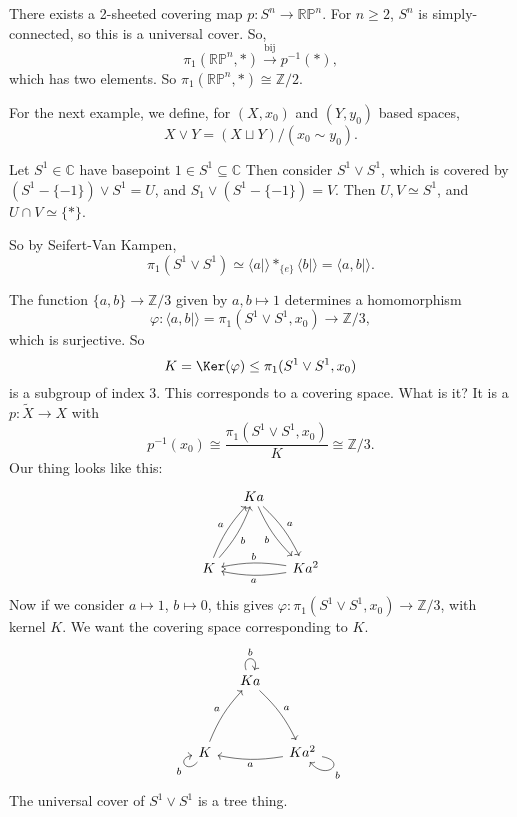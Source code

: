 \documentclass[12pt]{article}
\begin{document}
\begin{exbox}
	There exists a 2-sheeted covering map $p : S^n \to \mathbb{RP}^n$. For $n \geq 2$, $S^n$ is simply-connected, so this is a universal cover. So,
	\[
		\pi_1(\mathbb{RP}^n, \ast) \overset{\text{bij}}{\to} p^{-1}(\ast),
	\]
	which has two elements. So $\pi_1(\mathbb{RP}^n, \ast) \cong \mathbb{Z}/2$.
\end{exbox}

For the next example, we define, for $(X, x_0)$ and $(Y, y_0)$ based spaces,
\[
X \vee Y = (X \sqcup Y)/(x_0 \sim y_0).
\]

\begin{exbox}
	Let $S^1 \in \mathbb{C}$ have basepoint $1 \in S^1 \subseteq \mathbb{C}$ Then consider $S^{1} \vee S^1$, which is covered by $(S^1 - \{-1\}) \vee S^1 = U$, and $S_1 \vee (S^1 - \{-1\}) = V$. Then $U, V \simeq S^1$, and $U \cap V \simeq \{\ast\}$.

	So by Seifert-Van Kampen,
	\[
		\pi_1(S^1 \vee S^1) \simeq \langle a \mid \rangle \ast_{\{e\}} \langle b \mid \rangle = \langle a, b \mid \rangle.
	\]
\end{exbox}


\begin{exbox}
	The function $\{a, b\} \to \mathbb{Z}/3$ given by $a , b \mapsto 1$ determines a homomorphism
	\[
	\varphi : \langle a, b \mid \rangle = \pi_1(S^1 \vee S^1, x_0) \to \mathbb{Z}/3,
	\]
	which is surjective. So
	\[
	K = \Ker(\varphi) \leq \pi_1(S^1 \vee S^1, x_0)
	\]
	is a subgroup of index 3. This corresponds to a covering space. What is it? It is a $p : \tilde X \to X$ with
	\[
	p^{-1}(x_0) \cong \frac{\pi_1(S^1 \vee S^1, x_0)}{K} \cong \mathbb{Z}/3.
	\]
	Our thing looks like this:
	\[
	\begin{tikzcd}[column sep = small, row sep = huge]
		& Ka \arrow[dr, bend left = 10, "a"] \arrow[dr, bend right = 10, "b"'] & \\
		K \arrow[ur, bend left = 10, "a"] \arrow[ur, bend right = 10, "b"'] & & Ka^2 \arrow[ll, bend left = 10, "a"] \arrow[ll, bend right = 10, "b"']
	\end{tikzcd}
	\]
	Now if we consider $a \mapsto 1$, $b \mapsto 0$, this gives $\varphi : \pi_1(S^1 \vee S^1, x_0) \to \mathbb{Z}/3$, with kernel $K$. We want the covering space corresponding to $K$.
	\[
	\begin{tikzcd}[column sep = small, row sep = huge]
		& Ka \arrow[dr, bend left = 10, "a"] \arrow[loop, out = 110, in = 70, looseness = 5, "b"] & \\
		K \arrow[ur, bend left = 10, "a"] \arrow[loop, out = 230, in = 190, looseness = 5, "b"] & & Ka^2 \arrow[ll, bend left = 10, "a"] \arrow[loop, out = 350, in = 310, looseness = 5, "b"]
	\end{tikzcd}
	\]
	The universal cover of $S^1 \vee S^1$ is a tree thing.
\end{exbox}
\end{document}
